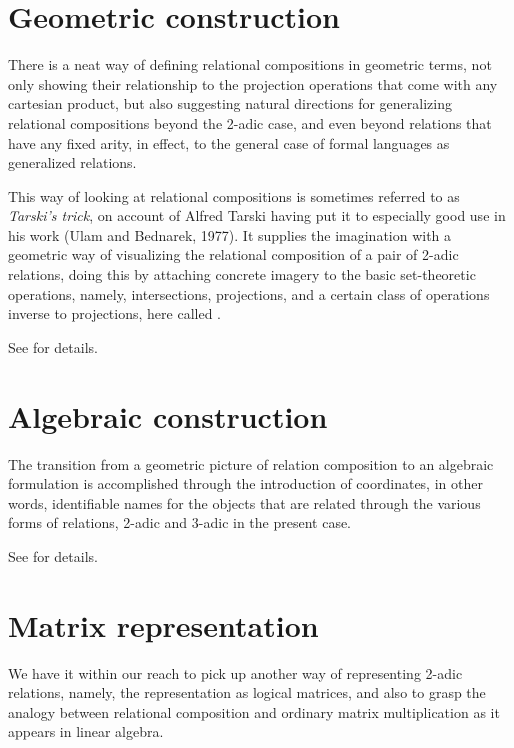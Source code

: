 \documentclass[12pt]{article}
\begin{document}
\section{Geometric construction}

There is a neat way of defining relational compositions in geometric terms, not only showing their relationship to the projection operations that come with any cartesian product, but also suggesting natural directions for generalizing relational compositions beyond the 2-adic case, and even beyond relations that have any fixed arity, in effect, to the general case of formal languages as generalized relations.

This way of looking at relational compositions is sometimes referred to as \textit{Tarski's trick}, on account of Alfred Tarski having put it to especially good use in his work (Ulam and Bednarek, 1977).  It supplies the imagination with a geometric way of visualizing the relational composition of a pair of 2-adic relations, doing this by attaching concrete imagery to the basic set-theoretic operations, namely, intersections, projections, and a certain class of operations inverse to projections, here called \textit{}.

See  for details. 

\section{Algebraic construction}

The transition from a geometric picture of relation composition to an algebraic formulation is accomplished through the introduction of coordinates, in other words, identifiable names for the objects that are related through the various forms of relations, 2-adic and 3-adic in the present case.

See  for details.

\section{Matrix representation}

We have it within our reach to pick up another way of representing 2-adic relations, namely, the representation as logical matrices, and also to grasp the analogy between relational composition and ordinary matrix multiplication as it appears in linear algebra.
\end{document}
